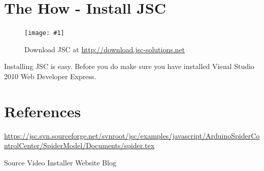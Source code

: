 \documentclass[12pt,leqno]{book}
\newcommand{\png}[1]{\texttt{[image: \#1]}}
\newcommand{\figpng}[2]{\begin{figure}[H!tb]\centering\png{#1}\caption{#2}\end{figure}}
\begin{document}
\chapter{The How - Install JSC}

\figpng{Images/jsc_-_Google_Chrome-2012-03-14_14.33.04}
{Download JSC at \url{http://download.jsc-solutions.net}}

Installing JSC is easy. Before you do make sure you have installed Visual Studio 2010 Web Developer Express.




\chapter{References}

\url{https://jsc.svn.sourceforge.net/svnroot/jsc/examples/javascript/ArduinoSpiderControlCenter/SpiderModel/Documents/spider.tex}


Source
Video
Installer
Website
Blog
\end{document}
